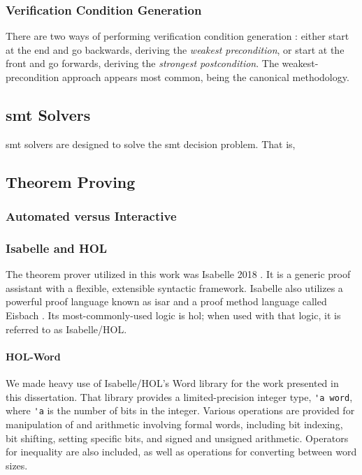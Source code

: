 \subsubsection{Verification Condition Generation}

There are two ways of performing verification condition generation%
:
either start at the end and go backwards, deriving the \emph{weakest precondition},%
or start at the front and go forwards, deriving the \emph{strongest postcondition}.%
The weakest-precondition approach appears most common,
being the canonical methodology.


\subsection{\acs*{smt} Solvers}
\Ac{smt} solvers are designed to solve the \acl{smt} decision problem.
That is, 

\subsection{Theorem Proving}
%

\subsubsection{Automated versus Interactive}

\subsubsection{Isabelle and HOL}
The theorem prover utilized in this work
was Isabelle 2018 \autocite{nipkow2002isabelle}.%
It is a generic proof assistant with a flexible, extensible syntactic framework.
Isabelle also utilizes a powerful proof language
known as \ac{isar}  \autocite{wenzel2007isabelle}
and a proof method language called Eisbach \autocite{matichuk2016eisbach}.
Its most-commonly-used logic is \ac{hol}; when used with that logic,
it is referred to as Isabelle/HOL.

\paragraph{HOL-Word}
We made heavy use of Isabelle/HOL's Word library \autocite{isabelle-word-session}
for the work presented in this dissertation.
That library provides a limited-precision integer type, \lstinline|'a word|,
where \lstinline|'a| is the number of bits in the integer.
Various operations are provided for manipulation of and arithmetic involving formal words,
including bit indexing, bit shifting, setting specific bits,
and signed and unsigned arithmetic.
Operators for inequality are also included,
as well as operations for converting between word sizes.

